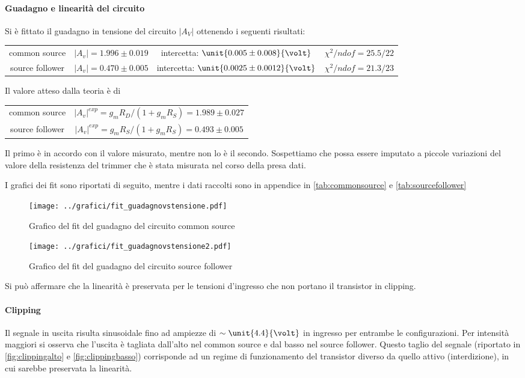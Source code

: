 \documentclass[10pt,a4paper]{article}
\begin{document}
\paragraph{Guadagno e linearità del circuito} Si è fittato il guadagno in tensione del circuito $|A_V|$ ottenendo i seguenti risultati:
\begin{table}[h!]
	\centering
	\begin{tabular}{cccc}
		common source & $|A_v| = 1.996 \pm 0.019$ & intercetta: $\unit{0.005 \pm 0.008}{\volt}$ & $\chi^2 / ndof = 25.5 / 22$\\
		source follower &	$|A_v| = 0.470 \pm 0.005$ & intercetta: $\unit{0.0025 \pm 0.0012}{\volt}$ & $\chi^2 / ndof = 21.3 / 23$
	\end{tabular}
\end{table}

Il valore atteso dalla teoria è di

\begin{table}[h!]
	\centering
	\begin{tabular}{cc}
		common source & $|A_v|^{exp} =g_mR_D/(1+g_mR_S) = 1.989 \pm 0.027$ \\
		source follower &	$|A_v|^{exp} =g_mR_S/(1+g_mR_S) = 0.493 \pm 0.005$
	\end{tabular}
\end{table}

Il primo è in accordo con il valore misurato, mentre non lo è il secondo. Sospettiamo che possa essere imputato a piccole variazioni del valore della resistenza del trimmer che è stata misurata nel corso della presa dati.

I grafici dei fit sono riportati di seguito, mentre i dati raccolti sono in appendice in \tablename{\ref{tab:commonsource}} e \tablename{\ref{tab:sourcefollower}}

\begin{figure}[h!]
	\centering
	\texttt{[image: ../grafici/fit\_guadagnovstensione.pdf]}
	\caption{Grafico del fit del guadagno del circuito common source}
\end{figure}
\begin{figure}[h!]
	\centering
	\texttt{[image: ../grafici/fit\_guadagnovstensione2.pdf]}
	\caption{Grafico del fit del guadagno del circuito source follower}
\end{figure}

 Si può affermare che la linearità è preservata per le tensioni d'ingresso che non portano il transistor in clipping.
  
 \paragraph{Clipping}
Il segnale in uscita risulta sinusoidale fino ad ampiezze di $\sim \unit{4.4}{\volt}$ in ingresso per entrambe le configurazioni.
Per intensità maggiori si osserva che l'uscita è tagliata dall'alto nel common source e dal basso nel source follower. Questo taglio del segnale (riportato in \figurename{\ref{fig:clippingalto}} e \figurename{\ref{fig:clippingbasso}}) corrisponde ad un regime di funzionamento del transistor diverso da quello attivo (interdizione), in cui sarebbe preservata la linearità.
\end{document}
